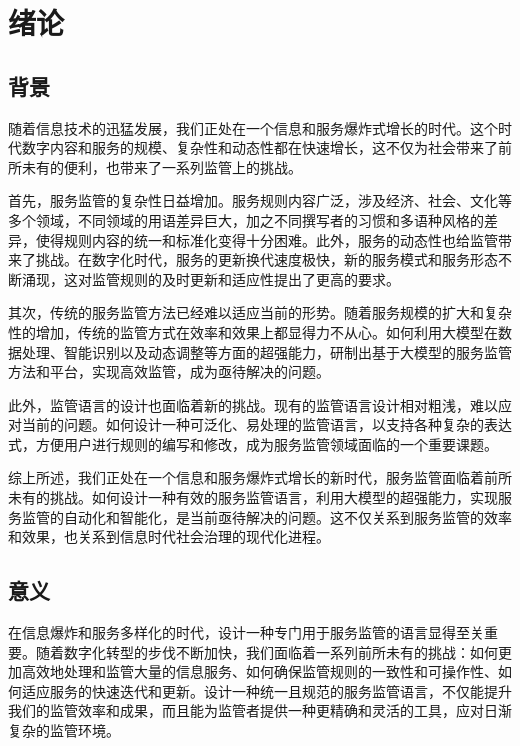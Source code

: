 \cleardoublepage

\section{绪论}

\subsection{背景}

随着信息技术的迅猛发展，我们正处在一个信息和服务爆炸式增长的时代。这个时代数字内容和服务的规模、复杂性和动态性都在快速增长，这不仅为社会带来了前所未有的便利，也带来了一系列监管上的挑战。

首先，服务监管的复杂性日益增加。服务规则内容广泛，涉及经济、社会、文化等多个领域，不同领域的用语差异巨大，加之不同撰写者的习惯和多语种风格的差异，使得规则内容的统一和标准化变得十分困难。此外，服务的动态性也给监管带来了挑战。在数字化时代，服务的更新换代速度极快，新的服务模式和服务形态不断涌现，这对监管规则的及时更新和适应性提出了更高的要求。

其次，传统的服务监管方法已经难以适应当前的形势。随着服务规模的扩大和复杂性的增加，传统的监管方式在效率和效果上都显得力不从心。如何利用大模型在数据处理、智能识别以及动态调整等方面的超强能力，研制出基于大模型的服务监管方法和平台，实现高效监管，成为亟待解决的问题。

此外，监管语言的设计也面临着新的挑战。现有的监管语言设计相对粗浅，难以应对当前的问题。如何设计一种可泛化、易处理的监管语言，以支持各种复杂的表达式，方便用户进行规则的编写和修改，成为服务监管领域面临的一个重要课题。

综上所述，我们正处在一个信息和服务爆炸式增长的新时代，服务监管面临着前所未有的挑战。如何设计一种有效的服务监管语言，利用大模型的超强能力，实现服务监管的自动化和智能化，是当前亟待解决的问题。这不仅关系到服务监管的效率和效果，也关系到信息时代社会治理的现代化进程。


\subsection{意义}

在信息爆炸和服务多样化的时代，设计一种专门用于服务监管的语言显得至关重要。随着数字化转型的步伐不断加快，我们面临着一系列前所未有的挑战：如何更加高效地处理和监管大量的信息服务、如何确保监管规则的一致性和可操作性、如何适应服务的快速迭代和更新。设计一种统一且规范的服务监管语言，不仅能提升我们的监管效率和成果，而且能为监管者提供一种更精确和灵活的工具，应对日渐复杂的监管环境。

